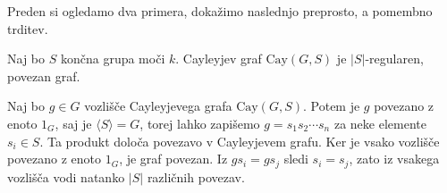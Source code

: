 Preden si ogledamo dva primera, dokažimo naslednjo preprosto, a pomembno trditev.

\begin{trditev}\label{trd_lastnosti_cayleyjevega_grafa}
    Naj bo $S$ končna grupa moči $k$. Cayleyjev graf $\text{Cay}(G, S)$ je $\lvert S \rvert$-regularen, povezan graf.
\end{trditev}
\begin{dokaz}
    Naj bo $g \in G$ vozlišče Cayleyjevega grafa $\text{Cay}(G, S)$. Potem je $g$ povezano z enoto $1_G$, saj je $\langle S \rangle = G$, torej lahko zapišemo
    $g = s_1 s_2 \cdots s_n$ za neke elemente $s_i \in S$. Ta produkt določa povezavo v Cayleyjevem grafu. Ker je vsako vozlišče povezano z enoto $1_G$, je graf povezan. Iz $g s_i = g s_j$ sledi $s_i = s_j$, zato iz vsakega vozlišča vodi natanko $\lvert S \rvert$ različnih povezav.
\end{dokaz}

